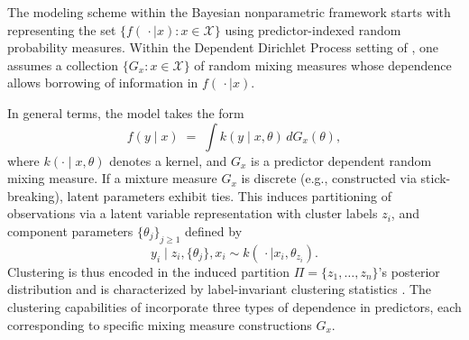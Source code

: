 \documentclass[article]{jss}\usepackage[]{graphicx}\usepackage[]{xcolor}
\begin{document}
The modeling scheme within the Bayesian nonparametric framework starts with representing the set $\{f(\,\cdot\mid x): x\in\mathcal{X}\}$ using predictor-indexed random probability measures. Within the Dependent Dirichlet Process setting of \citet{MacEachern1999,MacEachern2000}, one assumes a collection $\{G_x: x\in\mathcal{X}\}$ of random mixing measures whose dependence allows borrowing of information in $f(\,\cdot\mid x)$.

In general terms, the model takes the form
\begin{equation*}
f(y\mid x) \;=\; \int k\!\left(y\mid x,\theta\right)\, dG_x(\theta),
\end{equation*}
where $k(\cdot\mid x,\theta)$ denotes a kernel, and $G_x$ is a predictor dependent random mixing measure. If a mixture measure $G_x$ is discrete (e.g., constructed via stick-breaking), latent parameters exhibit ties. This induces partitioning of observations via a latent variable representation with cluster labels $z_i$, and component parameters $\{\theta_j\}_{j\ge1}$ defined by
\begin{equation*}
y_i \mid z_i,\{\theta_j\},x_i \sim k\!\left(\,\cdot \mid x_i,\theta_{z_i}\right).
\end{equation*}
Clustering is thus encoded in the induced partition $\Pi=\{z_1,\ldots,z_n\}$'s posterior distribution and is characterized by label-invariant clustering statistics \citep{Binder1978,Dahl2006}. The clustering capabilities of  incorporate three types of dependence in predictors, each corresponding to specific mixing measure constructions $G_x$.
\end{document}

